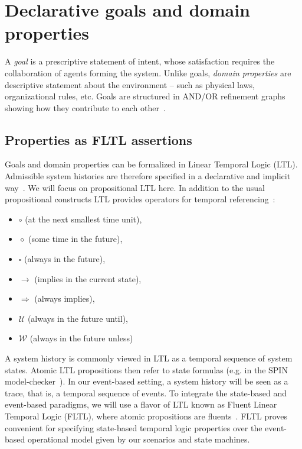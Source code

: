\section{Declarative goals and domain properties\label{section:background-goals}}

A \emph{goal} is a prescriptive statement of intent, whose satisfaction requires the collaboration of agents forming the system. Unlike goals, \emph{domain properties} are descriptive statement about the environment -- such as physical laws, organizational rules, etc. Goals are structured in AND/OR refinement graphs showing how they contribute to each other~\cite{VanLamsweerde:2000}.

\subsection{Properties as FLTL assertions}

Goals and domain properties can be formalized in Linear Temporal Logic (LTL). Admissible system histories are therefore specified in a declarative and implicit way~\cite{VanLamsweerde:2009}. We will focus on propositional LTL here. In addition to the usual propositional constructs LTL provides operators for temporal referencing~\cite{Manna:1992}: 

\begin{itemize}
\item $\circ$ (at the next smallest time unit), 
\item $\diamond$ (some time in the future), 
\item $\square$ (always in the future), 
\item $\rightarrow$ (implies in the current state), 
\item $\Rightarrow$ (always implies), 
\item $\mathcal{U}$ (always in the future until), 
\item $\mathcal{W}$ (always in the future unless)
\end{itemize}

A system history is commonly viewed in LTL as a temporal sequence of system states. Atomic LTL propositions then refer to state formulas (e.g. in the SPIN model-checker~\cite{Holzmann:1997}). In our event-based setting, a system history will be seen as a trace, that is, a temporal sequence of events. To integrate the state-based and event-based paradigms, we will use a flavor of LTL known as Fluent Linear Temporal Logic (FLTL), where atomic propositions are fluents~\cite{Giannakopoulou:2003}. FLTL proves convenient for specifying state-based temporal logic properties over the event-based operational model given by our scenarios and state machines. 


